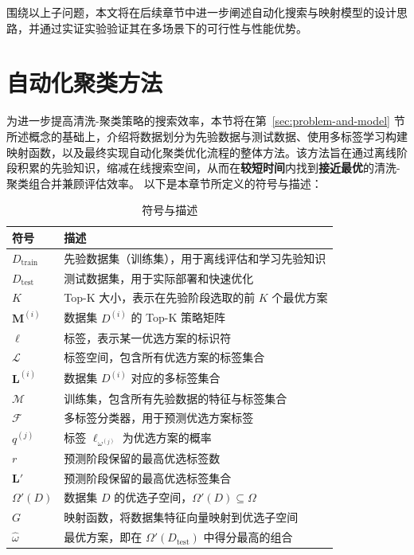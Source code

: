 \documentclass[10pt]{article} %
\numberwithin{equation}{section}
\begin{document}
围绕以上子问题，本文将在后续章节中进一步阐述自动化搜索与映射模型的设计思路，并通过实证实验验证其在多场景下的可行性与性能优势。



\section{自动化聚类方法}
\label{sec:autoML}

为进一步提高清洗-聚类策略的搜索效率，本节将在第~\ref{sec:problem-and-model} 节所述概念的基础上，介绍将数据划分为先验数据与测试数据、使用多标签学习构建映射函数，以及最终实现自动化聚类优化流程的整体方法。该方法旨在通过离线阶段积累的先验知识，缩减在线搜索空间，从而在\textbf{较短时间}内找到\textbf{接近最优}的清洗-聚类组合并兼顾评估效率。
以下是本章节所定义的符号与描述：

\begin{table}[ht]
\centering
\small %
\renewcommand{\arraystretch}{1.1} %
\label{tab:symbols-advanced}
\begin{tabular}{ll}
\toprule
\textbf{符号} & \textbf{描述} \\
\midrule
$D_{\text{train}}$ & 先验数据集（训练集），用于离线评估和学习先验知识 \\
$D_{\text{test}}$ & 测试数据集，用于实际部署和快速优化 \\
$K$ & Top-K 大小，表示在先验阶段选取的前 $K$ 个最优方案 \\
$\mathbf{M}^{(i)}$ & 数据集 $D^{(i)}$ 的 Top-K 策略矩阵 \\
$\ell$ & 标签，表示某一优选方案的标识符 \\
$\mathcal{L}$ & 标签空间，包含所有优选方案的标签集合 \\
$\mathbf{L}^{(i)}$ & 数据集 $D^{(i)}$ 对应的多标签集合 \\
$\mathcal{M}$ & 训练集，包含所有先验数据的特征与标签集合 \\
$\mathcal{F}$ & 多标签分类器，用于预测优选方案标签 \\
$q^{(j)}$ & 标签 $\ell_{\omega^{(j)}}$ 为优选方案的概率 \\
$r$ & 预测阶段保留的最高优选标签数 \\
$\mathbf{L}'$ & 预测阶段保留的最高优选标签集合 \\
$\Omega'(D)$ & 数据集 $D$ 的优选子空间，$\Omega'(D) \subseteq \Omega$ \\
$G$ & 映射函数，将数据集特征向量映射到优选子空间 \\
$\hat{\omega}$ & 最优方案，即在 $\Omega'(D_{\text{test}})$ 中得分最高的组合 \\
\bottomrule
\end{tabular}
\caption{符号与描述}
\end{table}
\end{document}
